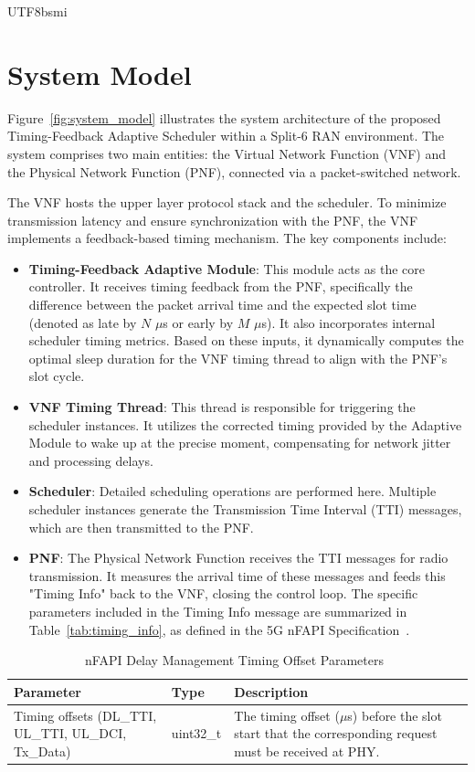 \documentclass[conference]{IEEEtran}
\begin{document}
\begin{CJK}{UTF8}{bsmi}
\section{System Model}
\label{sec:system_model}

{\color{blue}
Figure~\ref{fig:system_model} illustrates the system architecture of the proposed Timing-Feedback Adaptive Scheduler within a Split-6 RAN environment. The system comprises two main entities: the Virtual Network Function (VNF) and the Physical Network Function (PNF), connected via a packet-switched network.

The VNF hosts the upper layer protocol stack and the scheduler. To minimize transmission latency and ensure synchronization with the PNF, the VNF implements a feedback-based timing mechanism. The key components include:

\begin{itemize}
    \item \textbf{Timing-Feedback Adaptive Module}: This module acts as the core controller. It receives timing feedback from the PNF, specifically the difference between the packet arrival time and the expected slot time (denoted as late by $N$ $\mu$s or early by $M$ $\mu$s). It also incorporates internal scheduler timing metrics. Based on these inputs, it dynamically computes the optimal sleep duration for the VNF timing thread to align with the PNF's slot cycle.
    \item \textbf{VNF Timing Thread}: This thread is responsible for triggering the scheduler instances. It utilizes the corrected timing provided by the Adaptive Module to wake up at the precise moment, compensating for network jitter and processing delays.
    \item \textbf{Scheduler}: Detailed scheduling operations are performed here. Multiple scheduler instances generate the Transmission Time Interval (TTI) messages, which are then transmitted to the PNF.
    \item \textbf{PNF}: The Physical Network Function receives the TTI messages for radio transmission. It measures the arrival time of these messages and feeds this "Timing Info" back to the VNF, closing the control loop. The specific parameters included in the Timing Info message are summarized in Table~\ref{tab:timing_info}, as defined in the 5G nFAPI Specification~\cite{nfapi_spec}.
\end{itemize}
}

\begin{table}[htbp]
\caption{nFAPI Delay Management Timing Offset Parameters~\cite{nfapi_spec}}
\label{tab:delay_mgmt_offsets}
\begin{center}
\begin{tabularx}{\columnwidth}{X|l|X}
\toprule
\textbf{Parameter} & \textbf{Type} & \textbf{Description} \\ \midrule
Timing offsets (DL\_TTI, UL\_TTI, UL\_DCI, Tx\_Data) & uint32\_t & The timing offset ($\mu$s) before the slot start that the corresponding request must be received at PHY. \\ \bottomrule
\end{tabularx}
\end{center}
\end{table}


\end{CJK}
\end{document}

